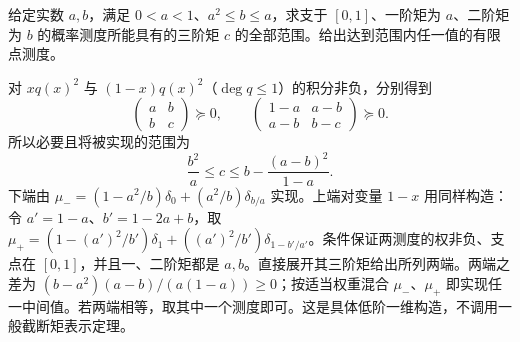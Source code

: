\begin{exercise}\label{b3:ex:G-localizing-matrix}
	给定实数 \(a,b\)，满足 \(0<a<1\)、\(a^2\le b\le a\)，求支于 \([0,1]\)、一阶矩为 \(a\)、二阶矩为 \(b\) 的概率测度所能具有的三阶矩 \(c\) 的全部范围。给出达到范围内任一值的有限点测度。
\end{exercise}
\begin{solution}
	对 \(xq(x)^2\) 与 \((1-x)q(x)^2\)（\(\deg q\le1\)）的积分非负，分别得到
	\[
		\begin{pmatrix}a&b\\b&c\end{pmatrix}\succeq0,\qquad
		\begin{pmatrix}1-a&a-b\\a-b&b-c\end{pmatrix}\succeq0.
	\]
	所以必要且将被实现的范围为
	\[
		\dfrac{b^2}{a}\le c\le b-\dfrac{(a-b)^2}{1-a}.
	\]
	下端由 \(\mu_-=(1-a^2/b)\delta_0+(a^2/b)\delta_{b/a}\) 实现。上端对变量 \(1-x\) 用同样构造：令 \(a'=1-a\)、\(b'=1-2a+b\)，取 \(\mu_+=(1-(a')^2/b')\delta_1+((a')^2/b')\delta_{1-b'/a'}\)。条件保证两测度的权非负、支点在 \([0,1]\)，并且一、二阶矩都是 \(a,b\)。直接展开其三阶矩给出所列两端。两端之差为 \((b-a^2)(a-b)/(a(1-a))\ge0\)；按适当权重混合 \(\mu_-\)、\(\mu_+\) 即实现任一中间值。若两端相等，取其中一个测度即可。这是具体低阶一维构造，不调用一般截断矩表示定理。
\end{solution}
